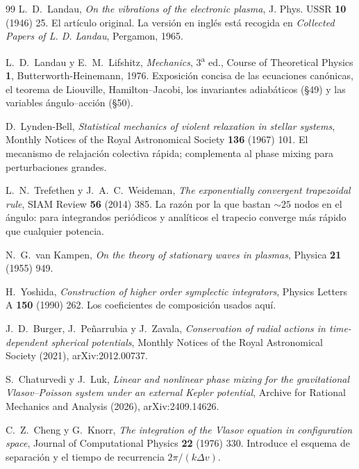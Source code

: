\documentclass[11pt,a4paper]{article}
\theoremstyle{definition}
\begin{document}
\begin{thebibliography}{99}
L.~D.~Landau,
\emph{On the vibrations of the electronic plasma},
J. Phys. USSR \textbf{10} (1946) 25.
\newblock El artículo original. La versión en inglés está recogida en
\emph{Collected Papers of L. D. Landau}, Pergamon, 1965.

L.~D.~Landau y E.~M.~Lifshitz,
\emph{Mechanics}, 3\textsuperscript{a} ed., Course of Theoretical Physics
\textbf{1}, Butterworth-Heinemann, 1976.
\newblock Exposición concisa de las ecuaciones canónicas, el teorema de Liouville,
Hamilton--Jacobi, los invariantes adiabáticos (\S49) y las variables
ángulo--acción (\S50).

D.~Lynden-Bell,
\emph{Statistical mechanics of violent relaxation in stellar systems},
Monthly Notices of the Royal Astronomical Society \textbf{136} (1967) 101.
\newblock El mecanismo de relajación colectiva rápida; complementa al phase mixing
para perturbaciones grandes.

L.~N.~Trefethen y J.~A.~C.~Weideman,
\emph{The exponentially convergent trapezoidal rule},
SIAM Review \textbf{56} (2014) 385.
\newblock La razón por la que bastan $\sim25$ nodos en el ángulo: para integrandos
periódicos y analíticos el trapecio converge más rápido que cualquier potencia.

N.~G.~van Kampen,
\emph{On the theory of stationary waves in plasmas},
Physica \textbf{21} (1955) 949.

H.~Yoshida,
\emph{Construction of higher order symplectic integrators},
Physics Letters A \textbf{150} (1990) 262.
\newblock Los coeficientes de composición usados aquí.


J.~D.~Burger, J.~Peñarrubia y J.~Zavala,
\emph{Conservation of radial actions in time-dependent spherical potentials},
Monthly Notices of the Royal Astronomical Society (2021), arXiv:2012.00737.

S.~Chaturvedi y J.~Luk,
\emph{Linear and nonlinear phase mixing for the gravitational Vlasov--Poisson
system under an external Kepler potential},
Archive for Rational Mechanics and Analysis (2026), arXiv:2409.14626.

C.~Z.~Cheng y G.~Knorr,
\emph{The integration of the Vlasov equation in configuration space},
Journal of Computational Physics \textbf{22} (1976) 330.
\newblock Introduce el esquema de separación y el tiempo de recurrencia
$2\pi/(k\Delta v)$.


\end{thebibliography}
\end{document}

